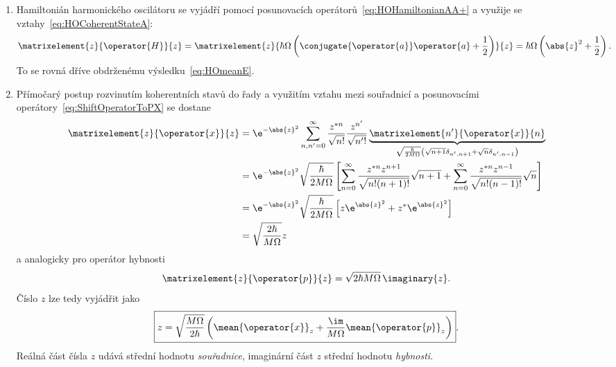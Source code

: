 \begin{solution}
	\begin{enumerate}
	\item 
		Hamiltonián harmonického oscilátoru se vyjádří pomocí posunovacích operátorů~\eqref{eq:HOHamiltonianAA+} a využije se vztahy~\eqref{eq:HOCoherentStateA}:
		\begin{equation}
			\matrixelement{z}{\operator{H}}{z}
				=\matrixelement{z}{\hbar\Omega\left(\conjugate{\operator{a}}\operator{a}+\frac{1}{2}\right)}{z}
				=\hbar\Omega\left(\abs{z}^{2}+\frac{1}{2}\right).
		\end{equation}
		To se rovná dříve obdrženému výsledku~\eqref{eq:HOmeanE}.
		
	\item
		Přímočarý postup rozvinutím koherentních stavů do řady a využitím vztahu mezi souřadnicí a posunovacími operátory~\eqref{eq:ShiftOperatorToPX} se dostane
		\begin{align}
			\matrixelement{z}{\operator{x}}{z}
				&=\e^{-\abs{z}^{2}}\sum_{n,n'=0}^{\infty}\frac{z^{*n}}{\sqrt{n!}}
					\frac{z^{n'}}{\sqrt{n'!}}
					\underbrace{\matrixelement{n'}{\operator{x}}{n}}_{\sqrt{\frac{\hbar}{2M\Omega}}
					\left(\sqrt{n+1}\delta_{n',n+1}+\sqrt{n}\delta_{n',n-1}\right)}\nonumber\\
				&=\e^{-\abs{z}^{2}}\sqrt{\frac{\hbar}{2M\Omega}}
					\left[\sum_{n=0}^{\infty}\frac{z^{*n}z^{n+1}}{\sqrt{n!(n+1)!}}\sqrt{n+1}
					+\sum_{n=0}^{\infty}\frac{z^{*n}z^{n-1}}{\sqrt{n!(n-1)!}}\sqrt{n}\right]\nonumber\\
				&=\e^{-\abs{z}^{2}}\sqrt{\frac{\hbar}{2M\Omega}}
					\left[z\e^{\abs{z}^{2}}+z^{*}\e^{\abs{z}^{2}}\right]\nonumber\\
				&=\sqrt{\frac{2\hbar}{M\Omega}}\real{z}
		\end{align}
		a analogicky pro operátor hybnosti
		\begin{equation}
			\matrixelement{z}{\operator{p}}{z}=\sqrt{2\hbar M\Omega}\,\imaginary{z}.
		\end{equation}		
		Číslo $z$ lze tedy vyjádřit jako
		\begin{equation}
			\label{eq:HOCoherentStateZ}
			\boxed{
			z=\sqrt{\frac{M\Omega}{2\hbar}}
				\left(\mean{\operator{x}}_{z}+\frac{\im}{M\Omega}\mean{\operator{p}}_{z}\right)
			}.
		\end{equation}
		Reálná část čísla $z$ udává střední hodnotu \emph{souřadnice}, 
		imaginární část $z$ střední hodnotu \emph{hybnosti}.				
				

\end{enumerate}
\end{solution}
